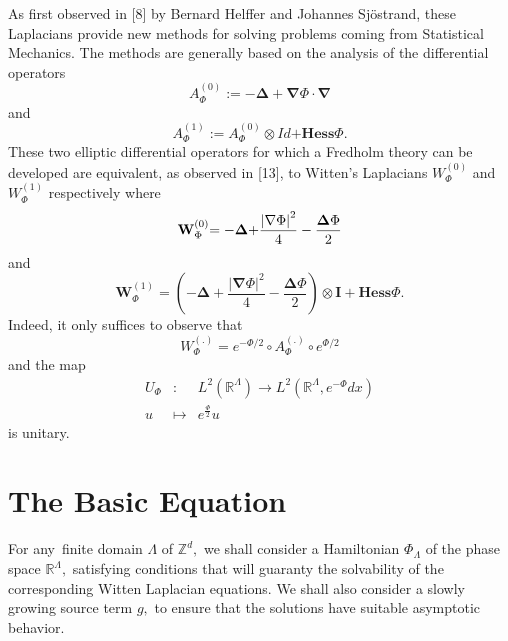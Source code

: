 \documentclass{article}
\begin{document}
As first observed in [8] by Bernard Helffer and Johannes Sj\"{o}strand,
these Laplacians provide new methods for solving problems coming from
Statistical Mechanics. The methods are generally based on the analysis of
the differential operators 
\begin{equation}
A_{\Phi }^{(0)}:=-\mathbf{\Delta }+\mathbf{\nabla }\Phi \cdot \mathbf{\nabla 
}
\end{equation}%
and%
\begin{equation}
A_{\Phi }^{(1)}:=A_{\Phi }^{(0)}\otimes Id\mathbf{+Hess}\Phi .
\end{equation}%
These two elliptic differential operators for which a Fredholm theory can be
developed are equivalent, as observed in [13], to Witten's Laplacians $%
W_{\Phi }^{(0)}$ and $W_{\Phi }^{(1)}$ respectively where%
\begin{equation}
\mathbf{W}_{\Phi }^{\left( 0\right) }\mathbf{=-\Delta +}\frac{\left| \mathbf{%
\nabla }\Phi \right| ^{2}}{4}-\frac{\mathbf{\Delta }\Phi }{2}
\end{equation}%
and%
\begin{equation}
\mathbf{W}_{\Phi }^{\left( 1\right) }=\left( \mathbf{-\Delta +}\frac{\left| 
\mathbf{\nabla }\Phi \right| ^{2}}{4}-\frac{\mathbf{\Delta }\Phi }{2}\right)
\otimes \mathbf{I}+\mathbf{Hess}\Phi .
\end{equation}%
Indeed, it only suffices to observe that 
\begin{equation}
W_{\Phi }^{(.)}=e^{-\Phi /2}\circ A_{\Phi }^{(.)}\circ e^{\Phi /2}
\end{equation}%
and the map 
\begin{eqnarray*}
U_{\Phi } &:&L^{2}(\mathbb{R}^{\Lambda })\rightarrow L^{2}(\mathbb{R}%
^{\Lambda },e^{-\Phi }dx) \\
u &\longmapsto &e^{\frac{\Phi }{2}}u
\end{eqnarray*}%
is unitary.

\section{The Basic Equation}

For any\ finite domain $\Lambda $ of $\mathbb{Z}^{d},$ we shall consider a
Hamiltonian $\Phi _{\Lambda }$ of the phase space $\mathbb{R}^{\Lambda },$
satisfying conditions that will guaranty the solvability of the
corresponding Witten Laplacian equations. We shall also consider a slowly
growing source term $g,$ to ensure that the solutions have suitable
asymptotic behavior.
\end{document}
